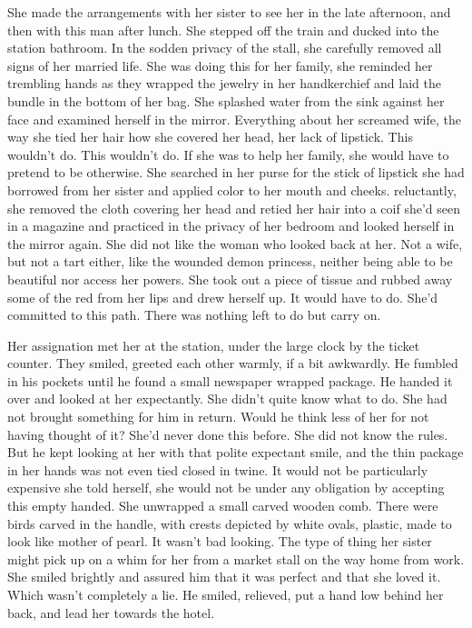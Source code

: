 \documentclass{article}
\begin{document}
She made the arrangements with her sister to see her in the late afternoon, and then with this man after lunch. She stepped off the train and ducked into the station bathroom. In the sodden privacy of the stall, she carefully removed all signs of her married life. She was doing this for her family, she reminded her trembling hands as they wrapped the jewelry in her handkerchief and laid the bundle in the bottom of her bag. She splashed water from the sink against her face and examined herself in the mirror. Everything about her screamed wife, the way she tied her hair how she covered her head, her lack of lipstick. This wouldn't do. This wouldn't do. If she was to help her family, she would have to pretend to be otherwise. She searched in her purse for the stick of lipstick she had borrowed from her sister and applied color to her mouth and cheeks. reluctantly, she removed the cloth covering her head and retied her hair into a coif she'd seen in a magazine and practiced in the privacy of her bedroom and looked herself in the mirror again. She did not like the woman who looked back at her. Not a wife, but not a tart either, like the wounded demon princess, neither being able to be beautiful nor access her powers. She took out a piece of tissue and rubbed away some of the red from her lips and drew herself up. It would have to do. She'd committed to this path. There was nothing left to do but carry on.

Her assignation met her at the station, under the large clock by the ticket counter. They smiled, greeted each other warmly, if a bit awkwardly. He fumbled in his pockets until he found a small newspaper wrapped package. He handed it over and looked at her expectantly. She didn't quite know what to do. She had not brought something for him in return. Would he think less of her for not having thought of it? She'd never done this before. She did not know the rules. But he kept looking at her with that polite expectant smile, and the thin package in her hands was not even tied closed in twine. It would not be particularly expensive she told herself, she would not be under any obligation by accepting this empty handed. She unwrapped a small carved wooden comb. There were birds carved in the handle, with crests depicted by white ovals, plastic, made to look like mother of pearl. It wasn't bad looking. The type of thing her sister might pick up on a whim for her from a market stall on the way home from work. She smiled brightly and assured him that it was perfect and that she loved it. Which wasn't completely a lie. He smiled, relieved, put a hand low behind her back, and lead her towards the hotel. 
\end{document}
